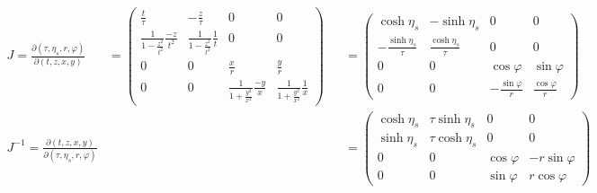 \begin{align}
    J=\frac{\partial(\tau,\eta_s,r,\varphi)}{\partial(t,z,x,y)} & =
    \begin{pmatrix}
        \frac{t}{\tau}                            & -\frac{z}{\tau}                        & 0                                       & 0                                      \\
        \frac{1}{1-\frac{z^2}{t^2}}\frac{-z}{t^2} & \frac{1}{1-\frac{z^2}{t^2}}\frac{1}{t} & 0                                       & 0                                      \\
        0                                         & 0                                      & \frac{x}{r}                             & \frac{y}{r}                            \\
        0                                         & 0                                      & \frac{1}{1+\frac{y^2}{x^2}}\frac{-y}{x} & \frac{1}{1+\frac{y^2}{x^2}}\frac{1}{x}
    \end{pmatrix}
                                                                &   & =
    \begin{pmatrix}
        \cosh\eta_s               & -\sinh\eta_s             & 0                      & 0                     \\
        -\frac{\sinh\eta_s}{\tau} & \frac{\cosh\eta_s}{\tau} & 0                      & 0                     \\
        0                         & 0                        & \cos\varphi            & \sin\varphi           \\
        0                         & 0                        & -\frac{\sin\varphi}{r} & \frac{\cos\varphi}{r}
    \end{pmatrix}                                              \\
    J^{-1}                                                      =\frac{\partial(t,z,x,y)}{\partial(\tau,\eta_s,r,\varphi)}
                                                                &   &   & =
    \begin{pmatrix}
        \cosh\eta_s & \tau\sinh\eta_s & 0           & 0             \\
        \sinh\eta_s & \tau\cosh\eta_s & 0           & 0             \\
        0           & 0               & \cos\varphi & -r\sin\varphi \\
        0           & 0               & \sin\varphi & r\cos\varphi
    \end{pmatrix}
\end{align}
